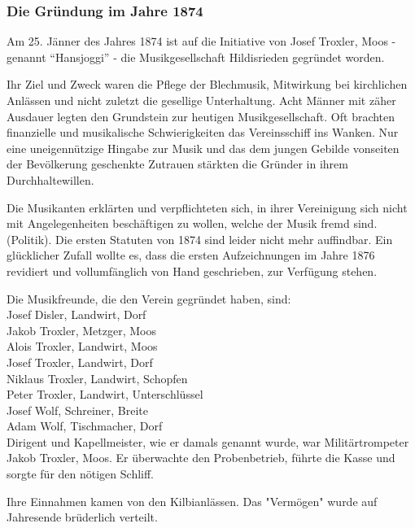 \begin{history}

    \subsubsection*{Die Gründung im Jahre 1874}

    Am 25. Jänner des Jahres 1874 ist auf die Initiative von Josef Troxler, Moos
    - genannt \enquote{Hansjoggi} - die Musikgesellschaft Hildisrieden gegründet
    worden.

    Ihr Ziel und Zweck waren die Pflege der Blechmusik, Mitwirkung bei
    kirchlichen Anlässen und nicht zuletzt die gesellige Unterhaltung. Acht
    Männer mit zäher Ausdauer legten den Grundstein zur heutigen
    Musikgesellschaft. Oft brachten finanzielle und musikalische Schwierigkeiten
    das Vereinsschiff ins Wanken. Nur eine uneigennützige Hingabe zur Musik und
    das dem jungen Gebilde vonseiten der Bevölkerung geschenkte Zutrauen
    stärkten die Gründer in ihrem Durchhaltewillen.

    Die Musikanten erklärten und verpflichteten sich, in ihrer Vereinigung sich
    nicht mit Angelegenheiten beschäftigen zu wollen, welche der Musik fremd
    sind. (Politik). Die ersten Statuten von 1874 sind leider nicht mehr
    auffindbar. Ein glücklicher Zufall wollte es, dass die ersten Aufzeichnungen
    im Jahre 1876 revidiert und vollumfänglich von Hand geschrieben, zur
    Verfügung stehen.

    Die Musikfreunde, die den Verein gegründet haben, sind:\\

    \noindent
    Josef Disler, Landwirt, Dorf\\
    Jakob Troxler, Metzger, Moos\\
    Alois Troxler, Landwirt, Moos\\
    Josef Troxler, Landwirt, Dorf\\
    Niklaus Troxler, Landwirt, Schopfen\\
    Peter Troxler, Landwirt, Unterschlüssel\\
    Josef Wolf, Schreiner, Breite\\
    Adam Wolf, Tischmacher, Dorf\\


    Dirigent und Kapellmeister, wie er damals genannt wurde, war
    Militärtrompeter Jakob Troxler, Moos. Er überwachte den Probenbetrieb,
    führte die Kasse und sorgte für den nötigen Schliff.

    Ihre Einnahmen kamen von den Kilbianlässen. Das "Vermögen" wurde auf
    Jahresende brüderlich verteilt.

\end{history}
